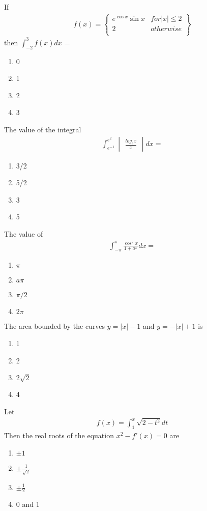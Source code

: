 \item If 
\begin{align*}
f(x) = 
\left\lbrace
\begin{array}{ll}
      e^{\cos x}\sin x & for |x| \leq 2 \\
      2 & otherwise \\
\end{array} 
\right\rbrace
\end{align*} 
then $\int_{-2}^{3}f(x)dx$ = 
\begin{enumerate}
\item 0
\item 1
\item 2
\item 3
\end{enumerate}

\item The value of the integral 
\begin{align*}
\int_{e^{-1}}^{e^{2}}\begin{vmatrix} \frac{log_ex}{x} \end{vmatrix}dx =
\end{align*}
\begin{enumerate}
\item 3/2
\item 5/2
\item 3
\item 5
\end{enumerate}

\item The value of 
\begin{align*}
\int_{-\pi}^{\pi}\frac{\cos^{2}x}{1 + a^{x}}dx = 
\end{align*}
\begin{enumerate}
\item $\pi$
\item $a\pi$
\item $\pi/2$
\item $2\pi$
\end{enumerate}

\item The area bounded by the curves $y = |x| - 1$ and $y = -|x| + 1$ is
\begin{enumerate}
\item 1
\item 2
\item $2\sqrt{2}$
\item 4
\end{enumerate}

\item Let
\begin{align*}
f(x) = \int_{1}^{x}\sqrt{2 - t^{2}}dt
\end{align*}
Then the real roots of the equation $x^2 - f'(x) = 0$ are
\begin{enumerate}
\item $\pm 1$
\item $\pm \frac{1}{\sqrt{2}}$
\item $\pm \frac{1}{2}$
\item 0 and 1
\end{enumerate}

